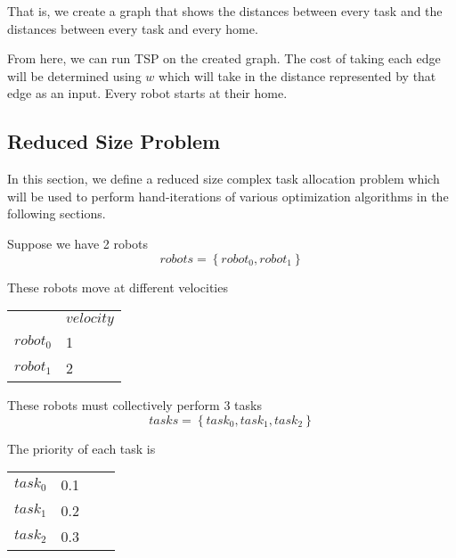 \documentclass[a4paper]{article}
\begin{document}
That is, we create a graph that shows the distances between every task and the distances between every task and every home.

From here, we can run TSP on the created graph. The cost of taking each edge will be determined using $w$ which will take in the distance represented by that edge as an input. Every robot starts at their home.

\subsection{Reduced Size Problem}



In this section, we define a reduced size complex task allocation problem which
will be used to perform hand-iterations of various optimization algorithms in
the following sections.

Suppose we have 2 robots
$$\mathit{robots} = \left\{ \mathit{robot}_0, \mathit{robot}_1 \right\}$$

These robots move at different velocities

\begin{tabular}{ll}
                   & $\mathit{velocity}$ \\
$\mathit{robot}_0$ & 1 \\
$\mathit{robot}_1$ & 2 \\
\end{tabular}
\vspace{1.5em}

These robots must collectively perform 3 tasks
$$\mathit{tasks} = \left\{ \mathit{task}_0, \mathit{task}_1,  \mathit{task}_2 \right\}$$

The priority of each task is

\begin{tabular}{llll}
$\mathit{task}_0$  & 0.1 \\
$\mathit{task}_1$  & 0.2 \\
$\mathit{task}_2$  & 0.3 \\
\end{tabular}
\vspace{1.5em}
\end{document}
